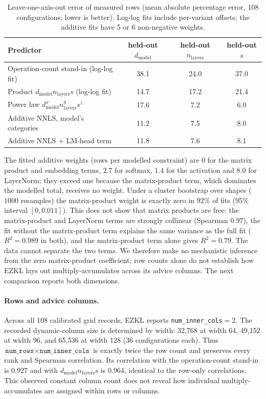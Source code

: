 \documentclass[10pt]{article}
\newcommand{\dmodel}{d_{\mathrm{model}}}
\newcommand{\nlayers}{n_{\mathrm{layers}}}
\begin{document}
\begin{table}[t]
\centering
\caption{Leave-one-axis-out error of measured rows (mean absolute percentage
  error, 108 configurations; lower is better). Log-log fits include
  per-variant offsets; the additive fits have 5 or 6 non-negative weights.}
\label{tab:loo}
\begin{tabular}{lccc}
\toprule
Predictor & held-out $\dmodel$ & held-out $\nlayers$ & held-out $s$ \\
\midrule
Operation-count stand-in (log-log fit) & 38.1 & 24.0 & 37.0 \\
Product $\dmodel\nlayers s$ (log-log fit) & 14.7 & 17.2 & 21.4 \\
Power law $\dmodel^{x}\nlayers^{y}s^{z}$ & 17.6 & 7.2 & 6.0 \\
Additive NNLS, model's categories & 11.2 & 7.5 & 8.0 \\
Additive NNLS $+$ LM-head term & 11.8 & 7.6 & 8.1 \\
\bottomrule
\end{tabular}
\end{table}

The fitted additive weights (rows per modelled constraint) are $0$ for the matrix
product and embedding terms, $2.7$ for softmax, $1.4$ for the activation and
$8.0$ for LayerNorm; they exceed one because the matrix-product term, which
dominates the modelled total, receives no weight. Under a cluster bootstrap over
shapes ($1000$ resamples) the matrix-product weight is exactly zero in $92\%$ of
fits (95\% interval $[0,0.011]$). This does not show that matrix products are
free: the matrix-product and LayerNorm terms are strongly collinear (Spearman
$0.97$), the fit without the matrix-product term explains the same variance as
the full fit ($R^2{=}0.989$ in both), and the matrix-product term alone gives
$R^2{=}0.79$. The data cannot separate the two terms. We therefore make no
mechanistic inference from the zero matrix-product coefficient; row counts
alone do not establish how EZKL lays out multiply-accumulates across its advice
columns. The next comparison reports both dimensions.

\paragraph{Rows and advice columns.}
Across all 108 calibrated grid records, EZKL reports
\texttt{num\_inner\_cols}$=2$. The recorded dynamic-column size is determined
by width: 32,768 at width 64, 49,152 at width 96, and 65,536 at width 128
(36 configurations each). Thus $\texttt{num\_rows}\times
\texttt{num\_inner\_cols}$ is exactly twice the row count and preserves every
rank and Spearman correlation. Its correlation with the operation-count
stand-in is $0.927$ and with $\dmodel\nlayers s$ is $0.964$, identical to the
row-only correlations. This observed constant column count does not reveal how
individual multiply-accumulates are assigned within rows or columns.
\end{document}
